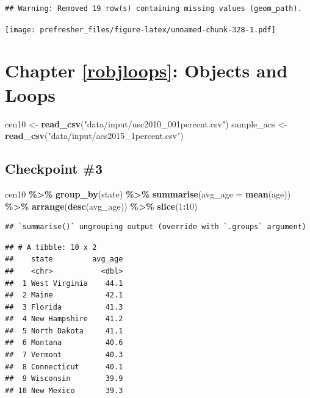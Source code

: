 \documentclass[
]{book}
\newenvironment{Shaded}{\begin{snugshade}}{\end{snugshade}}
\newcommand{\DataTypeTok}[1]{\textcolor[rgb]{0.13,0.29,0.53}{#1}}
\newcommand{\DecValTok}[1]{\textcolor[rgb]{0.00,0.00,0.81}{#1}}
\newcommand{\KeywordTok}[1]{\textcolor[rgb]{0.13,0.29,0.53}{\textbf{#1}}}
\newcommand{\NormalTok}[1]{#1}
\newcommand{\OperatorTok}[1]{\textcolor[rgb]{0.81,0.36,0.00}{\textbf{#1}}}
\newcommand{\StringTok}[1]{\textcolor[rgb]{0.31,0.60,0.02}{#1}}
\theoremstyle{definition}
\theoremstyle{definition}
\theoremstyle{definition}
\theoremstyle{remark}
\begin{document}
\begin{verbatim}
## Warning: Removed 19 row(s) containing missing values (geom_path).
\end{verbatim}

\texttt{[image: prefresher\_files/figure-latex/unnamed-chunk-328-1.pdf]}

\hypertarget{chapter-refrobjloops-objects-and-loops}{%
\section{Chapter \ref{robjloops}: Objects and Loops}\label{chapter-refrobjloops-objects-and-loops}}

\begin{Shaded}
\begin{Highlighting}[]
\NormalTok{cen10 <{-}}\StringTok{ }\KeywordTok{read\_csv}\NormalTok{(}\StringTok{"data/input/usc2010\_001percent.csv"}\NormalTok{)}
\NormalTok{sample\_acs <{-}}\StringTok{ }\KeywordTok{read\_csv}\NormalTok{(}\StringTok{"data/input/acs2015\_1percent.csv"}\NormalTok{)}
\end{Highlighting}
\end{Shaded}

\hypertarget{checkpoint-3}{%
\subsection*{Checkpoint \#3}\label{checkpoint-3}}

\begin{Shaded}
\begin{Highlighting}[]
\NormalTok{cen10 }\OperatorTok{\%>\%}
\StringTok{  }\KeywordTok{group\_by}\NormalTok{(state) }\OperatorTok{\%>\%}
\StringTok{  }\KeywordTok{summarise}\NormalTok{(}\DataTypeTok{avg\_age =} \KeywordTok{mean}\NormalTok{(age)) }\OperatorTok{\%>\%}
\StringTok{  }\KeywordTok{arrange}\NormalTok{(}\KeywordTok{desc}\NormalTok{(avg\_age)) }\OperatorTok{\%>\%}
\StringTok{  }\KeywordTok{slice}\NormalTok{(}\DecValTok{1}\OperatorTok{:}\DecValTok{10}\NormalTok{)}
\end{Highlighting}
\end{Shaded}

\begin{verbatim}
## `summarise()` ungrouping output (override with `.groups` argument)
\end{verbatim}

\begin{verbatim}
## # A tibble: 10 x 2
##    state         avg_age
##    <chr>           <dbl>
##  1 West Virginia    44.1
##  2 Maine            42.1
##  3 Florida          41.3
##  4 New Hampshire    41.2
##  5 North Dakota     41.1
##  6 Montana          40.6
##  7 Vermont          40.3
##  8 Connecticut      40.1
##  9 Wisconsin        39.9
## 10 New Mexico       39.3
\end{verbatim}
\end{document}

